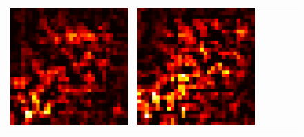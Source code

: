 \documentclass[preprint,12pt]{elsarticle}
\begin{document}
\begin{figure}[p]
\begin{tabular}{cccccc}
  \includegraphics[scale=\scale]{../visualizations/examples/cifar10/cnn/positive_saliency_map/3.png} & 
  \includegraphics[scale=\scale]{../visualizations/examples/cifar10/cnn/negative_saliency_map/3.png} & 

\end{tabular}
\end{figure}
\end{document}
